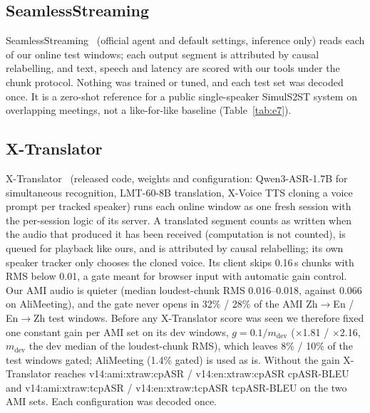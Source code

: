 \subsection{SeamlessStreaming}
\label{app:e7}
SeamlessStreaming~\citep{seamless2023} (official agent and default settings, inference only) reads each of our online
test windows; each output segment is attributed by causal relabelling, and text, speech and latency are scored with our
tools under the chunk protocol. Nothing was trained or tuned, and each test set was decoded once. It is a zero-shot
reference for a public single-speaker SimulS2ST system on overlapping meetings, not a like-for-like baseline
(Table~\ref{tab:e7}).


\ifXT
\subsection{X-Translator}
\label{app:xt}
X-Translator~\citep{zhao2026xtranslator} (released code, weights and configuration: Qwen3-ASR-1.7B for simultaneous
recognition, LMT-60-8B translation, X-Voice TTS cloning a voice prompt per tracked speaker) runs each online window as
one fresh session with the per-session logic of its server. A translated segment counts as written when the audio that
produced it has been received (computation is not counted), is queued for playback like ours, and is attributed by
causal relabelling; its own speaker tracker only chooses the cloned voice. Its client skips 0.16\,s chunks with RMS
below 0.01, a gate meant for browser input with automatic gain control. Our AMI audio is quieter (median loudest-chunk
RMS 0.016--0.018, against 0.066 on AliMeeting), and the gate never opens in 32\% / 28\% of the AMI Zh$\rightarrow$En /
En$\rightarrow$Zh test windows. Before any X-Translator score was seen we therefore fixed one constant gain per AMI set
on its dev windows, $g=0.1/m_\text{dev}$ ($\times$1.81 / $\times$2.16, $m_\text{dev}$ the dev median of the
loudest-chunk RMS), which leaves 8\% / 10\% of the test windows gated; AliMeeting (1.4\% gated) is used as is. Without
the gain X-Translator reaches \num{v14:ami:xtraw:cpASR} / \num{v14:en:xtraw:cpASR} cpASR-BLEU and
\num{v14:ami:xtraw:tcpASR} / \num{v14:en:xtraw:tcpASR} tcpASR-BLEU on the two AMI sets. Each configuration was decoded
once.
\fi

\ifCascade
